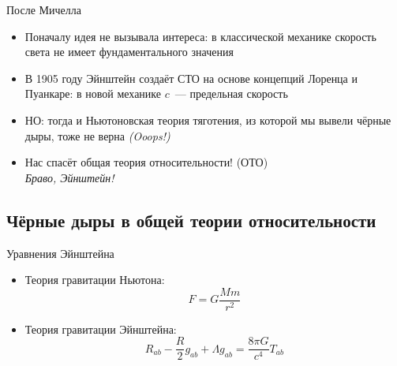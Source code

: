 \documentclass[usenames,dvipsnames,pdftex,unicode,hidelinks]{beamer}
\begin{document}
  \begin{frame}{После Мичелла}
    \begin{itemize}
      \item<1-> Поначалу идея \alert{не вызывала интереса}: в классической механике скорость света не
        имеет фундаментального значения
      \item<2-> В 1905 году Эйнштейн создаёт СТО на основе концепций Лоренца и Пуанкаре: в новой
        механике $c$~--- предельная скорость
      \item<3-> \alert{НО:} тогда и Ньютоновская теория тяготения, из которой мы вывели чёрные дыры,
        тоже не верна \emph{(Ooops!)}
      \item<4-> Нас спасёт \alert{общая теория относительности!} (ОТО)\\
        \emph{Браво, Эйнштейн!}
    \end{itemize}
  \end{frame}

  \subsection{Чёрные дыры в общей теории относительности}

  \begin{frame}{Уравнения Эйнштейна}
    \begin{itemize}[<+->]
      \item Теория гравитации Ньютона:
        \[
          F = G \frac{Mm}{r^2}
        \]
       \item Теория гравитации Эйнштейна:
         \[
           R_{ab} - \frac{R}{2}  g_{ab} + \Lambda g_{ab} = \frac{8 \pi G}{c^4} T_{ab}
         \]
    \end{itemize}
    \begin{flushright}
    \end{flushright}
    
  \end{frame}
\end{document}
